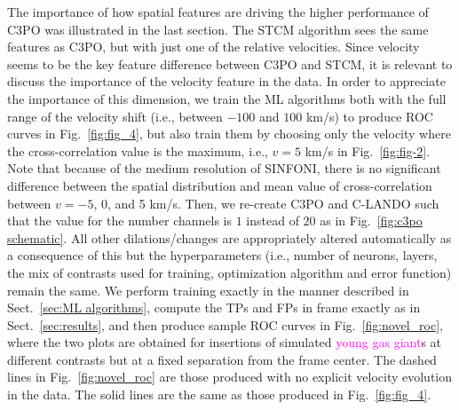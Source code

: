 \documentclass[referee]{aa} %
\newcommand{\newchange}[1]{\textcolor{magenta}{#1}}
\begin{document}
The importance of how spatial features are driving the higher performance of C3PO was illustrated in the last section. The STCM algorithm sees the same features as C3PO, but with just one of the relative velocities.
Since velocity seems to be the key feature difference between C3PO and STCM, it is relevant to discuss the importance of the velocity feature in the data. 
In order to appreciate the importance of this dimension, we train the ML algorithms both with the full range of the velocity shift (i.e., between $-100$ and $100$ km/s) to produce ROC curves in Fig.~\ref{fig:fig_4}, but also train them by choosing only the velocity where the cross-correlation value is the maximum, i.e., $v=5$ km/s in Fig.~\ref{fig:fig-2}.
Note that because of the medium resolution of SINFONI, there is no significant difference between the spatial distribution and mean value of cross-correlation between $v=-5$, 0, and 5 km/s. 
Then, we re-create C3PO and C-LANDO such that the value for the number channels is $1$ instead of $20$ as in Fig.~\ref{fig:c3po schematic}.
All other dilations/changes are appropriately altered automatically as a consequence of this but the hyperparameters (i.e., number of neurons, layers, the mix of contrasts used for training, optimization algorithm and error function) remain the same.
We perform training exactly in the manner described in Sect.~\ref{sec:ML algorithms}, compute the TPs and FPs in frame exactly as in Sect.~\ref{sec:results}, and then produce sample ROC curves in Fig.~\ref{fig:novel_roc}, where the two plots are obtained for insertions of simulated \newchange{young gas giant}s at different contrasts but at a fixed separation from the frame center.
The dashed lines in Fig.~\ref{fig:novel_roc} are those produced with no explicit velocity evolution in the data.
The solid lines are the same as those produced in Fig.~\ref{fig:fig_4}.
\end{document}
